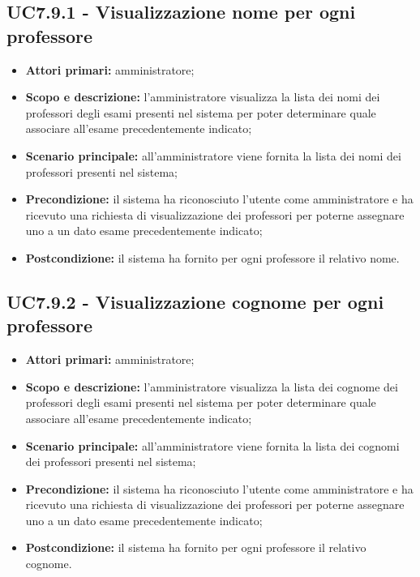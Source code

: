 \documentclass[AnalisiDeiRequisiti.tex]{subfiles}
\begin{document}
\subsection{UC7.9.1 - Visualizzazione nome per ogni professore}
\begin{itemize}
	\item \textbf{Attori primari:} amministratore;
	\item \textbf{Scopo e descrizione:} l'amministratore visualizza la lista dei nomi dei professori degli esami presenti nel sistema per poter determinare quale associare all'esame precedentemente indicato;
	\item \textbf{Scenario principale:} all'amministratore viene fornita la lista dei nomi dei professori presenti nel sistema;
	\item \textbf{Precondizione:} il sistema ha riconosciuto l'utente come amministratore e ha ricevuto una richiesta di visualizzazione dei professori per poterne assegnare uno a un dato esame precedentemente indicato; 
	\item \textbf{Postcondizione:} il sistema ha fornito per ogni professore il relativo nome.
\end{itemize}
\subsection{UC7.9.2 - Visualizzazione cognome per ogni professore}
\begin{itemize}
	\item \textbf{Attori primari:} amministratore;
	\item \textbf{Scopo e descrizione:} l'amministratore visualizza la lista dei cognome dei professori degli esami presenti nel sistema per poter determinare quale associare all'esame precedentemente indicato;
	\item \textbf{Scenario principale:} all'amministratore viene fornita la lista dei cognomi dei professori presenti nel sistema;
	\item \textbf{Precondizione:} il sistema ha riconosciuto l'utente come amministratore e ha ricevuto una richiesta di visualizzazione dei professori per poterne assegnare uno a un dato esame precedentemente indicato; 
	\item \textbf{Postcondizione:} il sistema ha fornito per ogni professore il relativo cognome.
\end{itemize}
\end{document}
